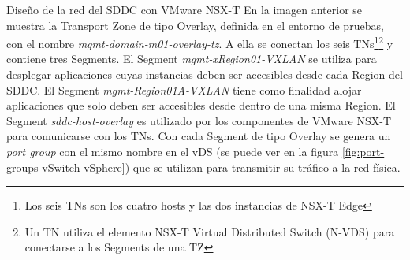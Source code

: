 \begin{subsubsection}{Diseño de la red del SDDC con VMware NSX-T}
      En la imagen anterior se muestra la Transport Zone de tipo Overlay, definida en el entorno de pruebas, con el nombre \textit{mgmt-domain-m01-overlay-tz}. A ella se conectan los seis TNs\footnote{Los seis TNs son los cuatro hosts y las dos instancias de NSX-T Edge}\footnote{Un TN utiliza el elemento NSX-T Virtual Distributed Switch (N-VDS) para conectarse a los Segments de una TZ} y contiene tres Segments. El Segment \textit{mgmt-xRegion01-VXLAN} se utiliza para desplegar aplicaciones cuyas instancias deben ser accesibles desde cada Region del SDDC. El Segment \textit{mgmt-Region01A-VXLAN} tiene como finalidad alojar aplicaciones que solo deben ser accesibles desde dentro de una misma Region. El Segment \textit{sddc-host-overlay} es utilizado por los componentes de VMware NSX-T para comunicarse con los TNs. Con cada Segment de tipo Overlay se genera un \textit{port group} con el mismo nombre en el vDS (se puede ver en la figura \ref{fig:port-groups-vSwitch-vSphere}) que se utilizan para transmitir su tráfico a la red física.


\end{subsubsection}
